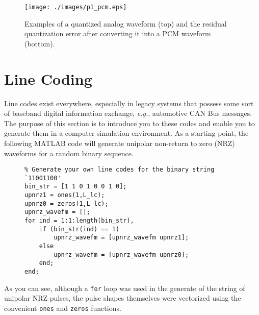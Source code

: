\documentclass[letterpaper,12pt]{article}
\begin{document}


\begin{figure}[h]
 \centering
 \texttt{[image: ./images/p1\_pcm.eps]}
 \caption{Examples of a quantized analog waveform (top) and the residual quantization error after converting it into a PCM waveform (bottom).}\label{f:p1_pcm}
\end{figure}
\bigskip


\section{Line Coding}

Line codes exist everywhere, especially in legacy systems that possess some sort of baseband digital information exchange, \textit{e.g.}, automotive CAN Bus messages. The purpose of this section
is to introduce you to these codes and enable you to generate them in a computer simulation environment. As a starting point, the following MATLAB code will generate unipolar non-return to zero (NRZ) waveforms
for a random binary sequence.
\begin{figure}[h]
\centering
\begin{minipage}[framed]{0.9\textwidth}
\begin{lstlisting}
% Generate your own line codes for the binary string `11001100'
bin_str = [1 1 0 1 0 0 1 0];
upnrz1 = ones(1,L_lc);
upnrz0 = zeros(1,L_lc);
upnrz_wavefm = [];
for ind = 1:1:length(bin_str),
    if (bin_str(ind) == 1)
        upnrz_wavefm = [upnrz_wavefm upnrz1];
    else
        upnrz_wavefm = [upnrz_wavefm upnrz0];
    end;
end;
\end{lstlisting}
\end{minipage}
\captionsetup{labelformat=empty}
\end{figure}

As you can see, although a \texttt{for} loop was used in the generate of the string of unipolar NRZ pulses, the pulse shapes themselves were vectorized using the convenient \texttt{ones} and \texttt{zeros} functions.
\end{document}

